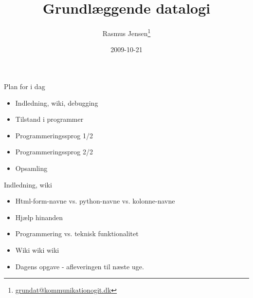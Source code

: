 \documentclass[a4paper,landscape]{slides}
\title{Grundlæggende datalogi}
\author{Rasmus Jensen\footnote{\url{grundat@kommunikationogit.dk}}}
\date{2009-10-21}
\begin{document}
\maketitle

\begin{comment}

- Opsamling, debugging og wiki
  - html-forms-navne, variabel-navne og kolonne-navne
  - wiki
  - dagens opgave: afleveringsopgaven til næste uge.
  - spørg også gerne hinanden om hjælp
  - debugging

- Tilstand i program
    - Flere sider fra samme program, - dispatch
    - Stateful vs. stateless connection, - hidden fields
- Evt. opsamling om programdesign
  - Inkrementel udvikling

- Programmeringssprog
    - Hvor bruges python...
    - Generelle programmeringsteknikker vs. konkrete sprog
    - Syntaks og semantik
    - Scriptingsprog, systemprogrammeringssprog
    - Programmeringsparadigmer: procedural programmering, OOP, funktionsorienteret programmering, logikprogrammering.
    - Dynamisk og statiske typer.

- JavaScript og python
- Spørgsmål?



\end{comment}




\begin{slide}
	\begin{center} {\large 
            Plan for i dag
	} \end{center}
	\begin{itemize} \addtolength{\itemsep}{-\baselineskip}
            \item Indledning, wiki, debugging
            \item Tilstand i programmer
            \item Programmeringssprog 1/2
            \item Programmeringssprog 2/2
            \item Opsamling
	\end{itemize}
\end{slide}

\begin{slide}
	\begin{center} {\large 
            Indledning, wiki
	} \end{center}
	\begin{itemize} \addtolength{\itemsep}{-\baselineskip}
            \item Html-form-navne vs. python-navne vs. kolonne-navne
            \item Hjælp hinanden
            \item Programmering vs. teknisk funktionalitet
            \item Wiki wiki wiki
            \item Dagens opgave - afleveringen til næste uge. 
	\end{itemize}
\end{slide}
\end{document}
